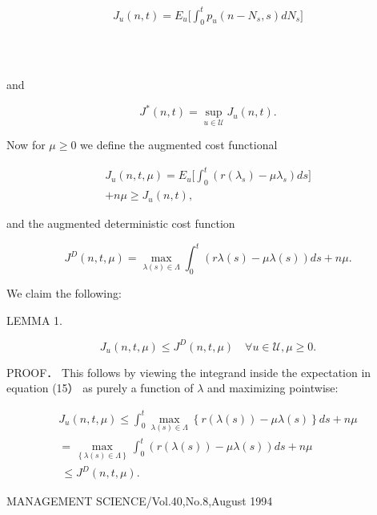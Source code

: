 \[
\begin{array} { l } { \displaystyle { J _ { u } ( n , t ) = E _ { u } \bigg [ \int _ { 0 } ^ { t } p _ { u } ( n - N _ { s } , s ) d N _ { s } \bigg ] } } \\ { \displaystyle { \phantom { \sum _ { u } } } } \\ { \displaystyle { \phantom { \sum _ { u } } } } \end{array}
\]

and

\[
J ^ { * } ( n , t ) = \operatorname* { s u p } _ { u \in \mathcal { U } } J _ { u } ( n , t ) .
\]

Now for \(\mu \geq 0\) we define the augmented cost functional

\[
\begin{array} { c } { { J _ { u } ( n , t , \mu ) = E _ { u } \Bigg [ \int _ { 0 } ^ { t } \left( r ( \lambda _ { s } ) - \mu \lambda _ { s } \right) d s \Bigg ] } } \\ { { + n \mu \geq J _ { u } ( n , t ) , } } \end{array}
\]

and the augmented deterministic cost function

\[
J ^ { D } ( n , t , \mu ) = \operatorname* { m a x } _ { \lambda ( s ) \in \Lambda } \int _ { 0 } ^ { t } { ( r \lambda ( s ) - \mu \lambda ( s ) ) d s } + n \mu .
\]

We claim the following:

LEMMA 1.

\[
J _ { u } ( n , t , \mu ) \leq J ^ { D } ( n , t , \mu ) \quad \forall u \in \mathcal { U } , \mu \geq 0 .
\]

PROOF． This follows by viewing the integrand inside the expectation in
equation (15） as purely a function of \(\lambda\) and maximizing
pointwise:

\[
\begin{array} { l } { \displaystyle { J _ { u } ( n , t , \mu ) \leq \int _ { 0 } ^ { t } \operatorname* { m a x } _ { \lambda ( s ) \in \Lambda } \left\{ r ( \lambda ( s ) ) - \mu \lambda ( s ) \right\} d s + n \mu } } \\ { \displaystyle { = \operatorname* { m a x } _ { \left\{ \lambda ( s ) \in \Lambda \right\} } \int _ { 0 } ^ { t } ( r ( \lambda ( s ) ) - \mu \lambda ( s ) ) d s + n \mu } } \\ { \displaystyle { \ \leq J ^ { D } ( n , t , \mu ) . } } \end{array}
\]

MANAGEMENT SCIENCE/Vol.40,No.8,August 1994


